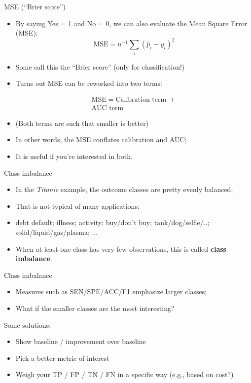 \documentclass[xcolor=table,aspectratio=169]{beamer}
\begin{document}
\begin{frame}{MSE (``Brier score'')}
	\begin{itemize}
		\item By saying Yes = 1 and No = 0, we can also evaluate the Mean Square Error (MSE):
		$$
		\text{MSE} =    n^{-1} \sum_i (\hat{p}_i - y_i)^2
		$$
		\item Some call this the ``Brier score'' (only for classification!)
		\item Turns out MSE can be reworked  into two terms:
		
		\begin{equation*}
			\begin{split}
				\text{MSE} = \text{Calibration term}\; + \\\text{AUC term}
			\end{split}
		\end{equation*}
		\item[] {\color{gray} (Both terms are such that smaller is better)}
		\item In other words, the MSE conflates calibration and AUC;
		\item It is useful if you're interested in both.
	\end{itemize}
\end{frame}


\begin{frame}{  Class imbalance}
	\begin{itemize}
		\item In the \emph{Titanic} example, the outcome classes are pretty
		evenly balanced;
		\item That is not typical of many applications:
		\item[] debt default; illness; activity; buy/don't buy;
		tank/dog/selfie/..; solid/liquid/gas/plasma; ...
		\item When at least one class has very few observations, this is
		called \textbf{class imbalance}.
	\end{itemize}
\end{frame}

\begin{frame}{Class imbalance}
	\begin{itemize}
		\item Measures such as SEN/SPE/ACC/F1 emphasize larger classes;
		\item What if the smaller classes are the most interesting?
	\end{itemize}
	
	\medskip
	Some solutions:
	\begin{itemize}
		\item Show baseline / improvement over baseline
		\item Pick a better metric of interest
		\item Weigh your TP / FP / TN / FN in a specific way (e.g., based on cost?)
	\end{itemize}
	
\end{frame}
\end{document}
